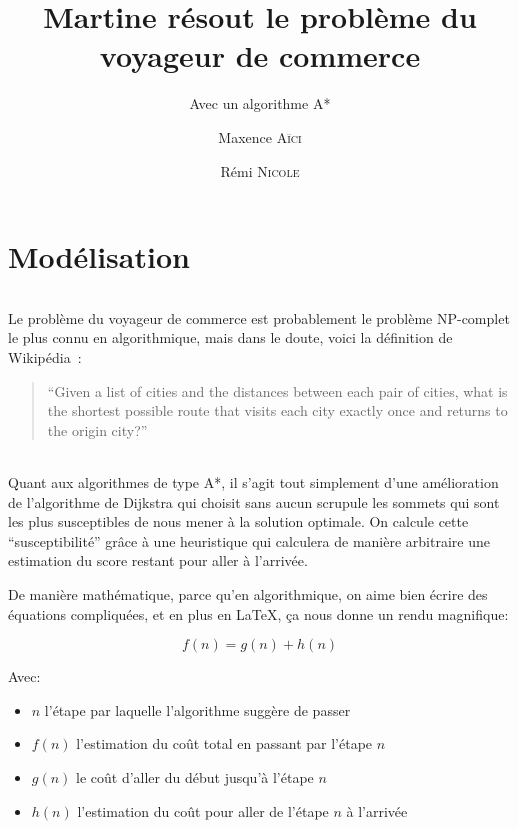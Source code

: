 \documentclass[french]{article}
\title{Martine résout le problème du voyageur de commerce}
\subtitle{Avec un algorithme A*}
\author{Maxence \textsc{Aïci} \and Rémi \textsc{Nicole}}
\begin{document}
\maketitle

\tableofcontents

\part{Modélisation}

\paragraph{} Le problème du voyageur de commerce est probablement le problème
NP-complet le plus connu en algorithmique, mais dans le doute, voici la
définition de Wikipédia~\cite{wiki:tsp}:

\begin{quote}
	``Given a list of cities and the distances between each
	pair of cities, what is the shortest possible route that visits each city
	exactly once and returns to the origin city?''
\end{quote}

\paragraph{} Quant aux algorithmes de type A*, il s'agit tout simplement d'une
amélioration de l'algorithme de Dijkstra qui choisit sans aucun scrupule les
sommets qui sont les plus susceptibles de nous mener à la solution optimale. On
calcule cette ``susceptibilité'' grâce à une heuristique qui calculera de
manière arbitraire une estimation du score restant pour aller à l'arrivée.

De manière mathématique, parce qu'en algorithmique, on aime bien écrire des
équations compliquées, et en plus en \LaTeX, ça nous donne un rendu magnifique:

\[f(n) = g(n) + h(n)\]

Avec:
\begin{itemize}
	\item $n$ l'étape par laquelle l'algorithme suggère de passer
	\item $f(n)$ l'estimation du coût total en passant par l'étape $n$
	\item $g(n)$ le coût d'aller du début jusqu'à l'étape $n$
	\item $h(n)$ l'estimation du coût pour aller de l'étape $n$ à l'arrivée
\end{itemize}
\end{document}
